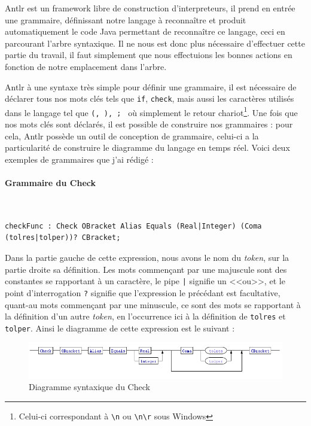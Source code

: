		Antlr est un framework libre de construction d'interpreteurs, il prend en entrée une grammaire, définissant notre langage à reconnaître et produit
		automatiquement le code Java permettant de reconnaître ce langage, ceci en parcourant l'arbre syntaxique. Il ne nous est donc plus nécessaire d'effectuer
		cette partie du travail, il faut simplement que nous effectuions les bonnes actions en fonction de notre emplacement dans l'arbre.

		Antlr à une syntaxe très simple pour définir une grammaire, il est nécessaire de déclarer tous nos mots clés tels que \texttt{if}, \texttt{check}, mais aussi les caractères utilisés dans le langage tel que \texttt{(, ), {; }} où simplement le retour chariot\footnote{Celui-ci correspondant à \texttt{\textbackslash n} ou \texttt{\textbackslash  n\textbackslash r} sous Windows}. Une fois que nos mots clés sont déclarés, il est possible de construire nos grammaires : pour cela, Antlr possède un outil de conception de grammaire, celui-ci a la particularité de construire le diagramme du langage en temps réel. Voici deux exemples de grammaires que j'ai rédigé :

		\paragraph{Grammaire du Check}~\\
\begin{lstlisting}[caption=Grammaire Check, numbers=none]
checkFunc : Check OBracket Alias Equals (Real|Integer) (Coma (tolres|tolper))? CBracket;
\end{lstlisting}
Dans la partie gauche de cette expression, nous avons le nom du \textit{token}, sur la partie droite sa définition. Les mots commençant par une majuscule sont
des constantes se rapportant à un caractère, le pipe \texttt{|} signifie un <<ou>>, et le point d'interrogation \texttt{?} signifie que l'expression le précédant est facultative, quant-au mots commençant par une minuscule, ce sont des mots se rapportant à la définition d'un autre \textit{token}, en l'occurrence ici à la définition de \texttt{tolres} et \texttt{tolper}. Ainsi le diagramme de cette expression est le suivant : 
\begin{figure}[H]
	\centering
	\includegraphics[width=18cm]{contents/images/check.png}
	\caption{Diagramme syntaxique du Check}
\end{figure}
